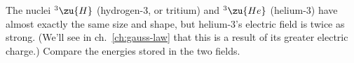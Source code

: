 The nuclei ${}^3\zu{H}$ (hydrogen-3, or tritium) and ${}^3\zu{He}$ (helium-3)
have almost exactly the same size and shape, but helium-3's electric field
is twice as strong. (We'll see in ch.~\ref{ch:gauss-law} that this is a result of
its greater electric charge.) Compare the energies stored in the two fields.
\answercheck\hwendpart
